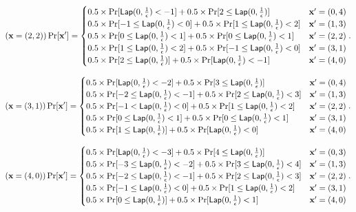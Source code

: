 \documentclass{article}
\begin{document}
{{\[
(\dataobs = (2,2)) \Pr[\dataobs']
= \begin{cases}
 	0.5 \times 
 	\Pr[	\lap{0}{\frac{1}{\epsilon}}	<	-1]
 	+ 	
 	0.5 \times 
 	\Pr[	2	\leq \lap{0}{\frac{1}{\epsilon}}] 
%
	& \dataobs' = (0, 4)\\
%
 	0.5 \times 
 	\Pr[	-1	\leq \lap{0}{\frac{1}{\epsilon}}	<	0] 
 	+ 	
 	0.5 \times 
 	\Pr[	1	\leq \lap{0}{\frac{1}{\epsilon}}	<	2] 
%
	& \dataobs' = (1, 3)\\
%
 	0.5 \times 
 	\Pr[	0	\leq	\lap{0}{\frac{1}{\epsilon}}	<	1] 
 	+ 	
 	0.5 \times 
 	\Pr[	0	\leq \lap{0}{\frac{1}{\epsilon}}	<	1] 
%
& \dataobs' = (2, 2)\\
%
 	0.5 \times 
 	\Pr[	1	\leq	\lap{0}{\frac{1}{\epsilon}}	<	2] 
 	+ 	
 	0.5 \times 
 	\Pr[	-1 	\leq	\lap{0}{\frac{1}{\epsilon}}	<	0] 
%
& \dataobs' = (3, 1)\\
%
 	0.5 \times 
 	\Pr[	2	\leq	\lap{0}{\frac{1}{\epsilon}}	] 
 	+ 	
 	0.5 \times 
 	\Pr[	\lap{0}{\frac{1}{\epsilon}}	<	-1] 
%
& \dataobs' = (4, 0)
\end{cases}.
\]


\[
( \dataobs = (3,1) ) \Pr[\dataobs']
= \begin{cases}
 	0.5 \times 
 	\Pr[	\lap{0}{\frac{1}{\epsilon}}	<	-2] 
 	+ 	
 	0.5 \times 
 	\Pr[	3	\leq \lap{0}{\frac{1}{\epsilon}}] 
	& \dataobs' = (0, 4)\\
%
 	0.5 \times 
 	\Pr[	-2	\leq \lap{0}{\frac{1}{\epsilon}}	<	-1] 
 	+ 	
 	0.5 \times 
 	\Pr[	2	\leq \lap{0}{\frac{1}{\epsilon}}	<	3] 
	& \dataobs' = (1, 3)\\
%
 	0.5 \times 
 	\Pr[	-1	<	\lap{0}{\frac{1}{\epsilon}}		<	0] 
 	+ 	
 	0.5 \times 
 	\Pr[	1	\leq \lap{0}{\frac{1}{\epsilon}}	<	2] 
	& \dataobs' = (2, 2)\\
%
 	0.5 \times 
 	\Pr[	0	\leq	\lap{0}{\frac{1}{\epsilon}}	<	1] 
 	+ 	
 	0.5 \times 
 	\Pr[	0	\leq	\lap{0}{\frac{1}{\epsilon}}	<	1] 
	& \dataobs' = (3, 1)\\
%
 	0.5 \times 
 	\Pr[	1	\leq	\lap{0}{\frac{1}{\epsilon}}	] 
 	+ 	
 	0.5 \times 
 	\Pr[	\lap{0}{\frac{1}{\epsilon}}	<	0] 
%
& \dataobs' = (4, 0)
\end{cases}.
\]


\[
(\dataobs = (4,0)) \Pr[\dataobs']
= \begin{cases}
 	0.5 \times 
 	\Pr[	\lap{0}{\frac{1}{\epsilon}}	<	-3] 
 	+ 	
 	0.5 \times 
 	\Pr[	4	\leq \lap{0}{\frac{1}{\epsilon}}] 
	& \dataobs' = (0, 3)\\
%
 	0.5 \times 
 	\Pr[	-3	\leq \lap{0}{\frac{1}{\epsilon}}	<	-2] 
 	+ 	
 	0.5 \times 
 	\Pr[	3	\leq \lap{0}{\frac{1}{\epsilon}}	<	4] 
	& \dataobs' = (1, 3)\\
%
 	0.5 \times 
 	\Pr[	-2	\leq	\lap{0}{\frac{1}{\epsilon}}	<	-1] 
 	+ 	
 	0.5 \times 
 	\Pr[	2	\leq 	\lap{0}{\frac{1}{\epsilon}}	<	3] 
	& \dataobs' = (2, 2)\\
%
 	0.5 \times 
 	\Pr[	-1	\leq	\lap{0}{\frac{1}{\epsilon}}	<	0] 
 	+ 	
 	0.5 \times 
 	\Pr[	1	\leq	\lap{0}{\frac{1}{\epsilon}}	<	2] 
	& \dataobs' = (3, 1)\\
%
 	0.5 \times 
 	\Pr[	0	\leq	\lap{0}{\frac{1}{\epsilon}}	] 
 	+ 	
 	0.5 \times 
 	\Pr[	\lap{0}{\frac{1}{\epsilon}}	<	1] 
%
& \dataobs' = (4, 0)
\end{cases}.
\]
}

}
\end{document}
